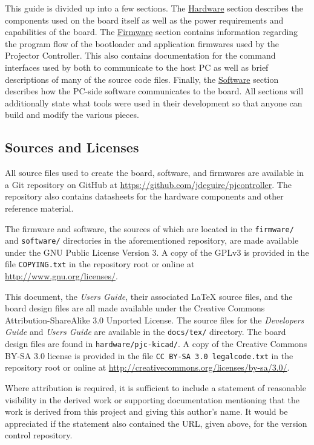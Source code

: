 \documentclass{article}
\begin{document}
This guide is divided up into a few sections.  The \hyperref[sec:Hardware]{Hardware} section
describes the components used on the board itself as well as the power requirements and capabilities
of the board.  The \hyperref[sec:Firmware]{Firmware} section contains information regarding the
program flow of the bootloader and application firmwares used by the Projector Controller.  This
also contains documentation for the command interfaces used by both to communicate to the host PC as
well as brief descriptions of many of the source code files.  Finally, the
\hyperref[sec:Software]{Software} section describes how the PC-side software communicates to the
board.  All sections will additionally state what tools were used in their development so that
anyone can build and modify the various pieces.

\subsection{Sources and Licenses} \label{ssec:SourceLic}
All source files used to create the board, software, and firmwares are available in a Git repository
on GitHub at \url{https://github.com/jdeguire/pjcontroller}.  The repository also contains
datasheets for the hardware components and other reference material.

The firmware and software, the sources of which are located in the \texttt{firmware/} and
\texttt{software/} directories in the aforementioned repository, are made available under the GNU
Public License Version 3.  A copy of the GPLv3 is provided in the file \texttt{COPYING.txt} in the
repository root or online at \url{http://www.gnu.org/licenses/}.

This document, the \textit{Users Guide}, their associated \LaTeX{} source files, and the board
design files are all made available under the Creative Commons Attribution-ShareAlike 3.0 Unported
License.  The source files for the \textit{Developers Guide} and \textit{Users Guide} are available
in the \texttt{docs/tex/} directory.  The board design files are found in
\texttt{hardware/pjc-kicad/}.  A copy of the Creative Commons BY-SA 3.0 license is provided in the
file \texttt{CC BY-SA 3.0 legalcode.txt} in the repository root or online at
\url{http://creativecommons.org/licenses/by-sa/3.0/}.

Where attribution is required, it is sufficient to include a statement of reasonable visibility in
the derived work or supporting documentation mentioning that the work is derived from this project
and giving this author's name.  It would be appreciated if the statement also contained the URL,
given above, for the version control repository.
\end{document}
